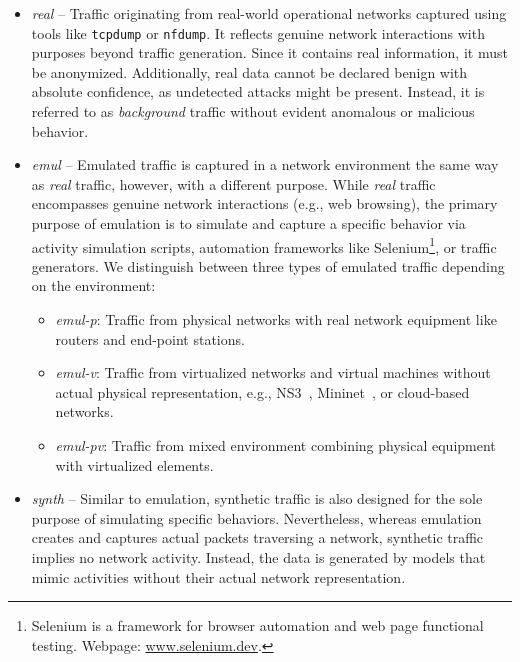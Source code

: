 \begin{itemize}[leftmargin=1.3em]
    \item \emph{real} -- Traffic originating from real-world operational networks captured using tools like \texttt{tcpdump} or \texttt{nfdump}. It reflects genuine network interactions with purposes beyond traffic generation. Since it contains real information, it must be anonymized. Additionally, real data cannot be declared benign with absolute confidence, as undetected attacks might be present. Instead, it is referred to as \emph{background} traffic without evident anomalous or malicious behavior.

    \item \emph{emul} -- Emulated traffic is captured in a network environment the same way as \emph{real} traffic, however, with a different purpose. While \emph{real} traffic encompasses genuine network interactions (e.g., web browsing), the primary purpose of emulation is to simulate and capture a specific behavior via activity simulation scripts, automation frameworks like Selenium\footnote{Selenium is a framework for browser automation and web page functional testing. Webpage: \url{www.selenium.dev}.}, or traffic generators. We distinguish between three types of emulated traffic depending on the environment:

    \begin{itemize}[topsep=0pt, itemsep=3pt]
        \renewcommand{\labelitemii}{$\circ$}
        \item \emph{emul-p}: Traffic from physical networks with real network equipment like routers and end-point stations.
        
        \item \emph{emul-v}: Traffic from virtualized networks and virtual machines without actual physical representation, e.g., NS3~\cite{riley2010_ns3}, Mininet~\cite{lantz2010_mininet}, or cloud-based networks.
        
        \item \emph{emul-pv}: Traffic from mixed environment combining physical equipment with virtualized elements.
    \end{itemize}

    \item \emph{synth} -- Similar to emulation, synthetic traffic is also designed for the sole purpose of simulating specific behaviors. Nevertheless, whereas emulation creates and captures actual packets traversing a network, synthetic traffic implies no network activity. Instead, the data is generated by models that mimic activities without their actual network representation.
\end{itemize}

